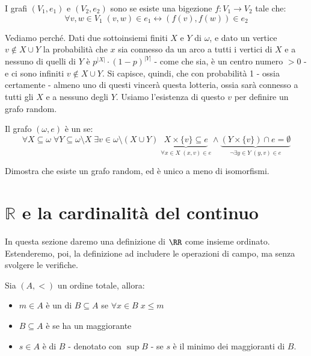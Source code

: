 \documentclass[11pt]{scrartcl}
\begin{document}
\begin{definition}
	I grafi $(V_1,e_1)$ e $(V_2,e_2)$ sono  se esiste una bigezione $f : V_1 \rightarrow V_2$ tale che:
	\[ \forall v,w \in V_1 \; (v,w) \in e_1 \longleftrightarrow (f(v),f(w)) \in e_2
		\]
\end{definition}

Vediamo perché. Dati due sottoinsiemi finiti $X$ e $Y$ di $\omega$, e dato un vertice $v \not \in X \cup Y$ la probabilità che $x$ sia connesso da un arco a tutti i vertici di $X$ e a nessuno di quelli di $Y$
è $p^{|X|} \cdot (1 - p)^{|Y|}$ - come che sia, è un centro numero $>0$ - e ci sono infiniti $v \not \in X \cup Y$. Si capisce, quindi, che con probabilità 1 - ossia certamente - almeno uno di questi vincerà questa lotteria, ossia sarà connesso 
a tutti gli $X$ e a nessuno degli $Y$. Usiamo l'esistenza di questo $v$ per definire un grafo random.

\begin{definition}
	Il grafo $(\omega,e)$ è un  se:
	\[ \forall X \subseteq \omega \; \forall Y \subseteq \omega\setminus X \; \exists v \in \omega \setminus(X \cup Y) \; \underbrace{X \times \{v\} \subseteq e}_{\forall x\in X \; (x,v) \in e} \land \underbrace{(Y \times \{v\}) \cap e = \emptyset}_{\neg\exists y \in Y \; (y,v) \in e}
		\]
\end{definition}

\begin{exercise}
	Dimostra che esiste un grafo random, ed è unico a meno di isomorfismi.
\end{exercise}

\newpage
\section{\texorpdfstring{$\mathbb{R}$ e la cardinalità del continuo}{R e la cardinalità del continuo}}

In questa sezione daremo una definizione di $\RR$ come insieme ordinato. Estenderemo, poi, la definizione ad includere le operazioni di campo, ma senza svolgere le verifiche.

\begin{definition}
	Sia $(A,<)$ un ordine totale, allora:
	\begin{itemize}
		\item $m \in A$ è un  di $B \subseteq A$ se $\forall x \in B \; x \leq m$
		\item $B \subseteq A$ è  se ha un maggiorante
		\item $s\in A$ è  di $B$ - denotato con $\sup B$ - se $s$ è il minimo dei maggioranti di $B$.
	\end{itemize}
\end{definition}
\end{document}
